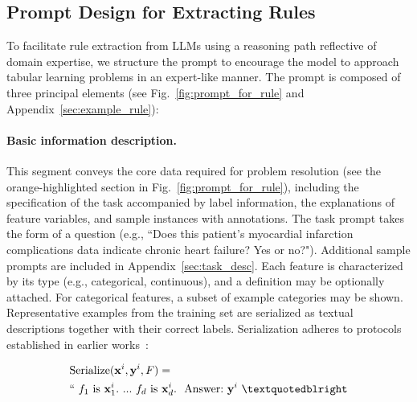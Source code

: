 \subsection{Prompt Design for Extracting Rules}
\label{Sec:prompt_design}
To facilitate rule extraction from LLMs using a reasoning path reflective of domain expertise, we structure the prompt to encourage the model to approach tabular learning problems in an expert-like manner. The prompt is composed of three principal elements (see Fig.~\ref{fig:prompt_for_rule} and Appendix~\ref{sec:example_rule}):

\vspace*{-0.12in}
\paragraph{Basic information description.} This segment conveys the core data required for problem resolution (see the orange-highlighted section in Fig.~\ref{fig:prompt_for_rule}), including the specification of the task accompanied by label information, the explanations of feature variables, and sample instances with annotations. The task prompt takes the form of a question (e.g., ``Does this patient's myocardial infarction complications data indicate chronic heart failure? Yes or no?"). Additional sample prompts are included in Appendix~\ref{sec:task_desc}. Each feature is characterized by its type (e.g., categorical, continuous), and a definition may be optionally attached. For categorical features, a subset of example categories may be shown. Representative examples from the training set are serialized as textual descriptions together with their correct labels. Serialization adheres to protocols established in earlier works~\cite{dinh2022lift,hegselmann2023tabllm}:

\begin{align}
&\text{Serialize}(\mathbf{x}^i,\mathbf{y}^i, F) = \nonumber \\ 
&``\ f_1\ \text{is}\ \mathbf{x}^i_1.\ ... \ f_d\  \text{is}\  \mathbf{x}^i_d.\ \ \text{Answer:}\  \mathbf{y}^i\ ”
\end{align}

\vspace*{-0.12in}
